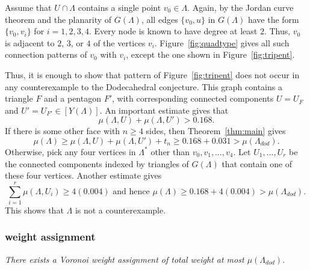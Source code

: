 \documentclass{article} %
\begin{document}
Assume that $U\cap\Lambda$ contains a single point $v_0\in\Lambda$.  Again, by
the Jordan curve theorem and the planarity of $G(\Lambda)$, 
all edges $\{v_0,u\}$ in $G(\Lambda)$ have the form
$\{v_0,v_i\}$ for $i=1,2,3,4$.  Every node is known to have degree
at least $2$.  Thus,  $v_0$ is adjacent to $2$, $3$, or $4$ of the vertices $v_i$.
Figure~\ref{fig:quadtype} gives all such connection patterns of $v_0$ with $v_i$, except
the one shown in Figure~\ref{fig:tripent}.  


\begin{floatingfigure}{25mm}
  \begin{center}
  \end{center}
  \caption{}
\label{fig:tripent}
\end{floatingfigure}




Thus, it is enough to show that pattern of Figure~\ref{fig:tripent} does not occur 
in any counterexample to the Dodecahedral conjecture.  This graph contains a triangle
$F$ and a pentagon $F'$, with corresponding connected components
$U=U_F$ and $U'=U_{F'}\in[Y(\Lambda)]$.
An important estimate \cite[Lemma~10.1]{arx} gives that
$$
\mu(\Lambda,U) + \mu(\Lambda,U') > 0.168.
$$
If there is some other face  with $n\ge 4$ sides, then 
Theorem~\ref{thm:main} gives
$$
\mu(\Lambda) \ge \mu(\Lambda,U)+\mu(\Lambda,U') + t_n \ge 0.168 + 0.031 > \mu(\Lambda_{dod}).
$$
Otherwise, pick any four vertices in $\Lambda^*$ other than $v_0,v_1,\ldots,v_4$.  Let $U_1,\ldots,U_r$ be the connected components
indexed by triangles of $G(\Lambda)$
that contain one of these four vertices.  
Another estimate \cite[Lemma~5.2]{arx} gives
$$
\sum_{i=1}^r \mu(\Lambda,U_i) \ge 4 (0.004) \text{ and hence }
\mu(\Lambda) \ge 0.168 + 4(0.004) > \mu(\Lambda_{dod}).
$$
This shows that $\Lambda$ is not a counterexample.


\subsubsection{weight assignment}

{\it There exists a Voronoi weight assignment of total weight at most $\mu(\Lambda_{dod})$.}
\end{document}
